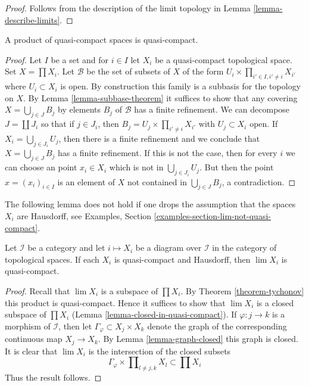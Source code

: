 \begin{proof}
Follows from the description of the limit topology
in Lemma \ref{lemma-describe-limits}.
\end{proof}

\begin{theorem}[Tychonov]
\label{theorem-tychonov}
A product of quasi-compact spaces is quasi-compact.
\end{theorem}

\begin{proof}
Let $I$ be a set and for $i \in I$ let $X_i$ be a quasi-compact topological
space. Set $X = \prod X_i$. Let $\mathcal{B}$ be the set of subsets of $X$
of the form $U_i \times \prod_{i' \in I, i' \not = i} X_{i'}$ where
$U_i \subset X_i$ is open. By construction this family is a subbasis
for the topology on $X$. By Lemma \ref{lemma-subbase-theorem} it
suffices to show that any covering $X = \bigcup_{j \in J} B_j$
by elements $B_j$ of $\mathcal{B}$ has a finite refinement.
We can decompose $J = \coprod J_i$ so that if $j \in J_i$, then
$B_j = U_j \times \prod_{i' \not = i} X_{i'}$ with $U_j \subset X_i$
open. If $X_i = \bigcup_{j \in J_i} U_j$, then there is a finite
refinement and we conclude that $X = \bigcup_{j \in J} B_j$
has a finite refinement. If this is not the case, then for every $i$
we can choose an point $x_i \in X_i$ which is not in
$\bigcup_{j \in J_i} U_j$. But then the point $x = (x_i)_{i \in I}$
is an element of $X$ not contained in $\bigcup_{j \in J} B_j$, a
contradiction.
\end{proof}

\noindent
The following lemma does not hold if one drops the assumption that
the spaces $X_i$ are Hausdorff, see
Examples, Section \ref{examples-section-lim-not-quasi-compact}.

\begin{lemma}
\label{lemma-inverse-limit-quasi-compact}
Let $\mathcal{I}$ be a category and let $i \mapsto X_i$
be a diagram over $\mathcal{I}$ in the category of topological
spaces. If each $X_i$ is quasi-compact and Hausdorff, then
$\lim X_i$ is quasi-compact.
\end{lemma}

\begin{proof}
Recall that $\lim X_i$ is a subspace of $\prod X_i$. By
Theorem \ref{theorem-tychonov} this product is quasi-compact. Hence it
suffices to show that $\lim X_i$ is a closed subspace of $\prod X_i$
(Lemma \ref{lemma-closed-in-quasi-compact}).
If $\varphi : j \to k$ is a morphism of $\mathcal{I}$, then
let $\Gamma_\varphi \subset X_j \times X_k$ denote the graph
of the corresponding continuous map $X_j \to X_k$. By
Lemma \ref{lemma-graph-closed} this graph is closed.
It is clear that $\lim X_i$ is the intersection of the
closed subsets
$$
\Gamma_\varphi \times \prod\nolimits_{l \not = j, k} X_l
\subset \prod X_i
$$
Thus the result follows.
\end{proof}

